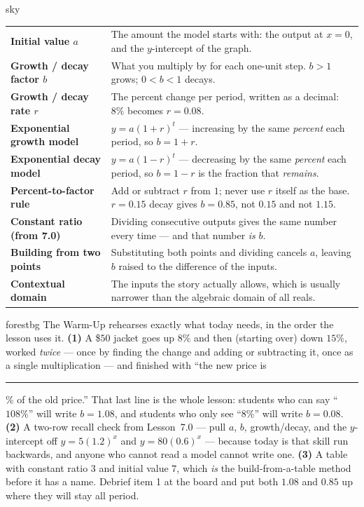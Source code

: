 \documentclass[10pt]{article}
\begin{document}
\begin{skillbox}{sky}
\renewcommand{\arraystretch}{1.3}
\begin{tabularx}{\linewidth}{@{}l X@{}}
\textbf{Initial value $a$} & The amount the model starts with: the output at $x=0$, and the $y$-intercept of the graph. \\
\textbf{Growth / decay factor $b$} & What you multiply by for each one-unit step. $b>1$ grows; $0<b<1$ decays. \\
\textbf{Growth / decay rate $r$} & The percent change per period, written as a decimal: $8\%$ becomes $r=0.08$. \\
\textbf{Exponential growth model} & $y=a(1+r)^{t}$ --- increasing by the same \emph{percent} each period, so $b=1+r$. \\
\textbf{Exponential decay model} & $y=a(1-r)^{t}$ --- decreasing by the same \emph{percent} each period, so $b=1-r$ is the fraction that \emph{remains}. \\
\textbf{Percent-to-factor rule} & Add or subtract $r$ from $1$; never use $r$ itself as the base. $r=0.15$ decay gives $b=0.85$, not $0.15$ and not $1.15$. \\
\textbf{Constant ratio (from 7.0)} & Dividing consecutive outputs gives the same number every time --- and that number \emph{is} $b$. \\
\textbf{Building from two points} & Substituting both points and dividing cancels $a$, leaving $b$ raised to the difference of the inputs. \\
\textbf{Contextual domain} & The inputs the story actually allows, which is usually narrower than the algebraic domain of all reals. \\
\end{tabularx}
\end{skillbox}

\begin{fixedskillbox}{forestbg}
    The Warm-Up rehearses exactly what today needs, in the order the lesson uses it. \textbf{(1)}
    A \$$50$ jacket goes up $8\%$ and then (starting over) down $15\%$, worked \emph{twice} --- once
    by finding the change and adding or subtracting it, once as a single multiplication --- and
    finished with ``the new price is \rule{0.7cm}{0.4pt}\% of the old price.'' That last line is the
    whole lesson: students who can say ``$108\%$'' will write $b=1.08$, and students who only see
    ``$8\%$'' will write $b=0.08$. \textbf{(2)} A two-row recall check from Lesson~7.0 --- pull $a$,
    $b$, growth/decay, and the $y$-intercept off $y=5(1.2)^{x}$ and $y=80(0.6)^{x}$ --- because
    today is that skill run backwards, and anyone who cannot read a model cannot write one.
    \textbf{(3)} A table with constant ratio $3$ and initial value $7$, which \emph{is} the
    build-from-a-table method before it has a name. Debrief item 1 at the board and put both
    $1.08$ and $0.85$ up where they will stay all period.
\end{fixedskillbox}
\end{document}

